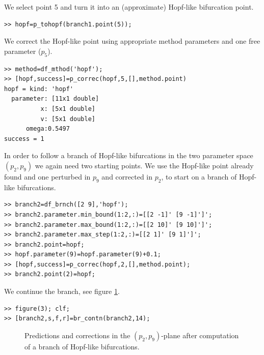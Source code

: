 \documentclass[10pt]{article}
\begin{document}
{We select point 5 and turn it into an (approximate) Hopf-like 
bifurcation point.
{\small\begin{verbatim}
>> hopf=p_tohopf(branch1.point(5));
\end{verbatim}}
We correct the Hopf-like point using appropriate method parameters
and one free parameter ($p_5$). 
{\small\begin{verbatim}
>> method=df_mthod('hopf');
>> [hopf,success]=p_correc(hopf,5,[],method.point)
hopf = kind: 'hopf'
  parameter: [11x1 double]
          x: [5x1 double]
          v: [5x1 double]
      omega:0.5497 
success = 1
\end{verbatim}}
In order to follow a branch of Hopf-like bifurcations in the two parameter
space $(p_2,p_9)$ we again need two starting points.
We use the Hopf-like point already found and one perturbed in $p_9$
and corrected in $p_2$, to start on a branch
of Hopf-like bifurcations.
{\small\begin{verbatim}
>> branch2=df_brnch([2 9],'hopf');
>> branch2.parameter.min_bound(1:2,:)=[[2 -1]' [9 -1]']';
>> branch2.parameter.max_bound(1:2,:)=[[2 10]' [9 10]']';
>> branch2.parameter.max_step(1:2,:)=[[2 1]' [9 1]']';    
>> branch2.point=hopf;
>> hopf.parameter(9)=hopf.parameter(9)+0.1;
>> [hopf,success]=p_correc(hopf,2,[],method.point);
>> branch2.point(2)=hopf;
\end{verbatim}}
We continue the branch, see figure \ref{br_hopf}.
{\small\begin{verbatim}
>> figure(3); clf;
>> [branch2,s,f,r]=br_contn(branch2,14);
\end{verbatim}}
\begin{figure}[h]
\begin{center}
\end{center}
\caption{\small\label{br_hopf} Predictions and corrections
in the $(p_2,p_9)$-plane after computation of a branch of Hopf-like 
bifurcations.}
\end{figure}

}
\end{document}
